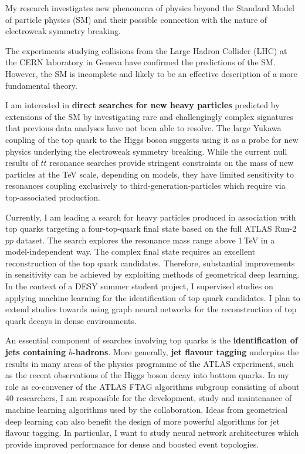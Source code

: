 \documentclass{article}
\begin{document}
\raisebox{.5cm}

My research investigates new phenomena of physics beyond the Standard Model of particle physics (SM) and their possible connection with the nature of electroweak symmetry breaking.

The experiments studying collisions from the Large Hadron Collider (LHC) at the CERN laboratory in Geneva have confirmed the predictions of the SM. However, the SM is incomplete and likely to be an effective description of a more fundamental theory.
\bigskip

I am interested in \textbf{direct searches for new heavy particles} predicted by extensions of the SM by investigating rare and challengingly complex signatures that previous data analyses have not been able to resolve.
The large Yukawa coupling of the top quark to the Higgs boson suggests using it as a probe for new physics underlying the electroweak symmetry breaking.
While the current null results of \(t\overline{t}\) resonance searches provide stringent constraints on the mass of new particles at the TeV scale, depending on models, they have limited sensitivity to resonances coupling exclusively to third-generation-particles which require via top-associated production.

Currently, I am leading a search for heavy particles produced in association with top quarks targeting a four-top-quark final state based on the full ATLAS Run-2 \(pp\) dataset. The search explores the resonance mass range above \(1\,\)TeV in a model-independent way.
The complex final state requires an excellent reconstruction of the top quark candidates. Therefore, substantial improvements in sensitivity can be achieved by exploiting methods of geometrical deep learning.
In the context of a DESY summer student project, I supervised studies on applying machine learning for the identification of top quark candidates. I plan to extend studies towards using graph neural networks for the reconstruction of top quark decays in dense environments.

\medskip

An essential component of searches involving top quarks is the \textbf{identification of jets containing \(b\)-hadrons}. More generally, \textbf{jet flavour tagging} underpins the results in many areas of the physics programme of the ATLAS experiment, such as the recent observations of the Higgs boson decay into bottom quarks.
In my role as co-convener of the ATLAS FTAG algorithms subgroup consisting of about 40 researchers, I am responsible for the development, study and maintenance of machine learning algorithms used by the collaboration.
Ideas from geometrical deep learning can also benefit the design of more powerful algorithms for jet flavour tagging. In particular, I want to study neural network architectures which provide improved performance for dense and boosted event topologies.
\end{document}
